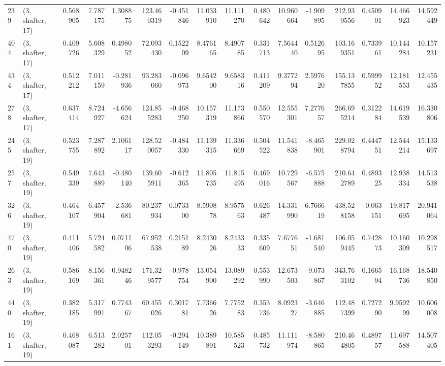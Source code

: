 \begin{tabular}{llrrrrrrrrrrrrrr}
239 &  (3, shafter, 17) &   0.568905 &   7.787175 &   1.308875 &   123.460319 &  -0.451846 &  11.033910 &  11.111270 &  0.480642 &  10.960664 &  -1.909895 &    212.939556 &    0.450901 &   14.466923 &   14.592449 \\
404 &  (3, shafter, 17) &   0.409726 &   5.608329 &   0.498052 &    72.093430 &   0.152209 &   8.476165 &   8.490785 &  0.331713 &   7.564440 &   0.512695 &    103.169351 &    0.733961 &   10.144284 &   10.157231 \\
434 &  (3, shafter, 17) &   0.512212 &   7.011159 &  -0.281936 &    93.283060 &  -0.096973 &   9.654200 &   9.658316 &  0.411209 &   9.377294 &   2.597620 &    155.137855 &    0.599952 &   12.181553 &   12.455435 \\
278 &  (3, shafter, 17) &   0.637414 &   8.724927 &  -4.656624 &   124.855283 &  -0.468250 &  10.157319 &  11.173866 &  0.550570 &  12.555301 &   7.277657 &    266.695214 &    0.312284 &   14.619539 &   16.330806 \\
245 &  (3, shafter, 19) &   0.523755 &   7.287892 &   2.106117 &   128.520057 &  -0.484330 &  11.139315 &  11.336669 &  0.504522 &  11.541838 &  -8.465901 &    229.028794 &    0.444751 &   12.544214 &   15.133697 \\
257 &  (3, shafter, 19) &   0.549339 &   7.643889 &  -0.480140 &   139.605911 &  -0.612365 &  11.805735 &  11.815495 &  0.469016 &  10.729567 &  -6.575888 &    210.642789 &    0.489325 &   12.938334 &   14.513538 \\
326 &  (3, shafter, 19) &   0.464107 &   6.457904 &  -2.536681 &    80.237934 &   0.073300 &   8.590878 &   8.957563 &  0.626487 &  14.331990 &   6.766619 &    438.528158 &   -0.063151 &   19.817695 &   20.941064 \\
470 &  (3, shafter, 19) &   0.411406 &   5.724582 &   0.071106 &    67.952538 &   0.215189 &   8.243026 &   8.243333 &  0.335609 &   7.677651 &  -1.681540 &    106.059445 &    0.742873 &   10.160309 &   10.298517 \\
263 &  (3, shafter, 19) &   0.586169 &   8.156361 &   0.948246 &   171.329577 &  -0.978754 &  13.054900 &  13.089292 &  0.553990 &  12.673503 &  -9.073867 &    343.763102 &    0.166594 &   16.168736 &   18.540850 \\
440 &  (3, shafter, 19) &   0.382185 &   5.317991 &   0.774367 &    60.455026 &   0.301781 &   7.736626 &   7.775283 &  0.353736 &   8.092327 &  -3.646885 &    112.487399 &    0.727290 &    9.959299 &   10.606008 \\
161 &  (3, shafter, 19) &   0.468087 &   6.513282 &   2.025701 &   112.053293 &  -0.294149 &  10.389891 &  10.585523 &  0.485732 &  11.111974 &  -8.580865 &    210.464805 &    0.489757 &   11.697588 &   14.507405 \\

\end{tabular}
